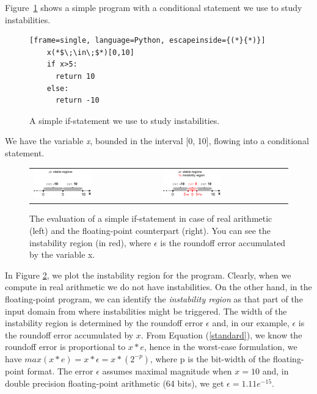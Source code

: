 Figure~\ref{fig:ifstatement} shows a simple program with a conditional statement we use to study instabilities.
%
\begin{figure}[tb!]
	\begin{lstlisting}[frame=single, language=Python, escapeinside={(*}{*)}]
	x(*$\;\in\;$*)[0,10]
	if x>5:
	  return 10
	else:
	  return -10	
	\end{lstlisting}
	\caption{A simple if-statement we use to study instabilities.}\label{fig:ifstatement}
\end{figure}
%
We have the variable \emph{x}, bounded in the interval [0, 10], flowing into a conditional statement.
%
\begin{figure}[tb!]
	\centering
	\begin{tabular}{ll}
		\includegraphics[width=0.48\textwidth]{pic/ifreal.png}
		&
		\includegraphics[width=0.48\textwidth]{pic/iffp.png}
	\end{tabular}
	\caption{The evaluation of a simple if-statement in case of real arithmetic (left) and the floating-point counterpart (right). You can see the instability region (in red), where $\epsilon$ is the roundoff error accumulated by the variable x.}
	\label{fig:ifreal}
\end{figure}
%
In Figure \ref{fig:ifreal}, we plot the instability region for the program. Clearly, when we compute in real arithmetic we do not have instabilities. On the other hand, in the floating-point program, we can identify the \emph{instability region} as that part of the input domain from where instabilities might be triggered.
%
The width of the instability region is determined by the roundoff error $\epsilon$ and, in our example, $\epsilon$ is the roundoff error accumulated by $x$. From Equation (\ref{standard}), we know the roundoff error is proportional to $x*e$, hence in the worst-case formulation, we have $max(x*e) = x*\epsilon = x*(2^{-p})$, where p is the bit-width of the floating-point format. The error $\epsilon$ assumes maximal magnitude when $x=10$ and, in double precision floating-point arithmetic (64 bits), we get $\epsilon=1.11e^{-15}$.
%

